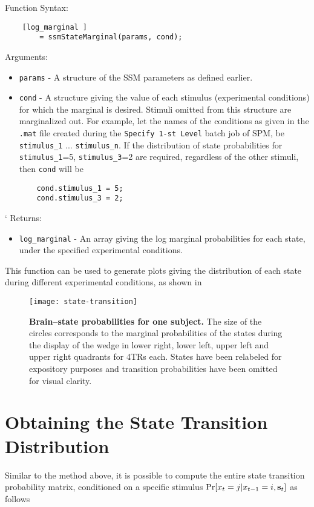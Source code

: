 Function Syntax:
\begin{verbatim}
    [log_marginal ]
        = ssmStateMarginal(params, cond);
\end{verbatim}
Arguments:
\begin{itemize}
  \item \verb"params" - A structure of the SSM parameters as
  defined earlier.
  \item \verb"cond" - A structure giving the value of each stimulus
  (experimental conditions) for which the
  marginal is desired. Stimuli omitted from this structure are
  marginalized out. For example, let the names of the conditions
  as given in the \verb".mat" file created during
  the \verb"Specify 1-st Level" batch job of SPM,
  be \verb"stimulus_1" ... \verb"stimulus_n". If the distribution of
  state probabilities for \verb"stimulus_1"=5, \verb"stimulus_3"=2 are
  required, regardless of the other stimuli, then \verb"cond" will
  be
\begin{verbatim}
    cond.stimulus_1 = 5;
    cond.stimulus_3 = 2;
\end{verbatim}

\end{itemize}`
Returns:
\begin{itemize}
    \item \verb"log_marginal" - An array giving the log marginal probabilities for
    each state, under the specified experimental conditions.
\end{itemize}

This function can be used to generate plots giving the distribution
of each state during different experimental conditions, as shown in
\begin{figure}
     \centering
    \texttt{[image: state-transition]}
     \caption[Brain--State Probabilities]
     {\textbf{Brain--state probabilities for one subject.}
     The size of the
     circles corresponds to the marginal probabilities
     of the states during the display of the wedge in lower right,
     lower left, upper left and upper right quadrants for 4TRs each.
     States have been relabeled for expository purposes and
     transition probabilities have been omitted for visual clarity.}
    \label{fig:state-trans}
    \vspace{-.3cm}
\end{figure}


\section{Obtaining the State Transition Distribution}
Similar to the method above, it is possible to compute the entire
state transition probability matrix, conditioned on a specific
stimulus $\Pr[{x}_{t} = j| {x}_{t-1} = i , {\mathbf{s}}_t]$ as follows

